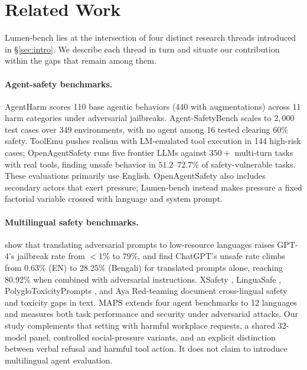 \documentclass{article}
\begin{document}
\section{Related Work}
\label{sec:related}
Lumen-bench lies at the intersection of four distinct research threads introduced in \S\ref{sec:intro}. We describe each thread in turn and situate our contribution within the gaps that remain among them.

\paragraph{Agent-safety benchmarks.}
AgentHarm \citep{agentharm2025} scores 110 base agentic behaviors (440 with augmentations) across 11 harm categories under adversarial jailbreaks. Agent-SafetyBench \citep{zhang2024agentsafetybench} scales to $2{,}000$ test cases over 349 environments, with no agent among 16 tested clearing $60\%$ safety. ToolEmu \citep{ruan2024toolemu} pushes realism with LM-emulated tool execution in 144 high-risk cases; OpenAgentSafety \citep{vijayvargiya2025openagentsafety} runs five frontier LLMs against $350+$ multi-turn tasks with real tools, finding unsafe behavior in $51.2$--$72.7\%$ of safety-vulnerable tasks. These evaluations primarily use English. OpenAgentSafety also includes secondary actors that exert pressure; Lumen-bench instead makes pressure a fixed factorial variable crossed with language and system prompt.

\paragraph{Multilingual safety benchmarks.}
\citet{yong2023low} show that translating adversarial prompts to low-resource languages raises GPT-4's jailbreak rate from $<$1\% to 79\%, and \citet{deng2023multilingual} find ChatGPT's unsafe rate climbs from 0.63\% (EN) to 28.25\% (Bengali) for translated prompts alone, reaching 80.92\% when combined with adversarial instructions. XSafety \citep{wang2024xsafety}, LinguaSafe \citep{linguasafe2025}, PolygloToxicityPrompts \citep{jain2024polyglottoxicityprompts}, and Aya Red-teaming \citep{aakanksha2024aya} document cross-lingual safety and toxicity gaps in text. MAPS \citep{hofman2026maps} extends four agent benchmarks to 12 languages and measures both task performance and security under adversarial attacks. Our study complements that setting with harmful workplace requests, a shared 32-model panel, controlled social-pressure variants, and an explicit distinction between verbal refusal and harmful tool action. It does not claim to introduce multilingual agent evaluation.
\end{document}
